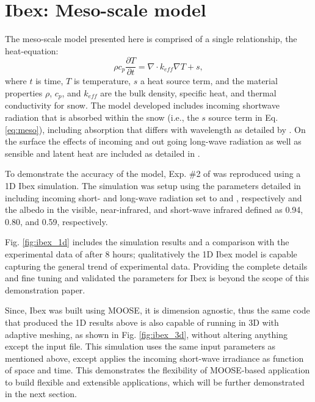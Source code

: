\section{Ibex: Meso-scale model}\label{sec:ibex}
The meso-scale model presented here is comprised of a single relationship, the heat-equation:
\begin{equation}\label{eq:meso}
\rho c_p \frac{\partial{T}}{\partial t} = \nabla \cdot k_{eff} \nabla T + s,
\end{equation}
where $t$ is time, $T$ is temperature, $s$ a heat source term, and the material properties $\rho$, $c_p$, and $k_{eff}$ are the bulk density, specific heat, and thermal conductivity for snow. The model developed includes incoming shortwave radiation that is absorbed within the snow (i.e., the $s$ source term in Eq. \eqref{eq:meso}), including absorption that differs with wavelength as detailed by \citet[][Ch.4]{slaughter2010numerical}. On the surface the effects of incoming and out going long-wave radiation as well as sensible and latent heat are included as detailed in \citet{slaughter2010numerical}.

To demonstrate the accuracy of the model, Exp. \#2 of \citet{morstad2007experimental} was reproduced using a 1D Ibex simulation. The simulation was setup using the parameters detailed in \citet[][Ch.4]{slaughter2010numerical} including incoming short- and long-wave radiation set to  and , respectively and the albedo in the visible, near-infrared, and short-wave infrared defined as 0.94, 0.80, and 0.59, respectively.

Fig. \ref{fig:ibex_1d} includes the simulation results and a comparison with the experimental data of \citet{morstad2007experimental} after 8 hours; qualitatively the 1D Ibex model is capable capturing the general trend of experimental data. Providing the complete details and fine tuning and validated the parameters for Ibex is beyond the scope of this demonstration paper.



Since, Ibex was built using MOOSE, it is dimension agnostic, thus the same code that produced the 1D results above is also capable of running in 3D with adaptive meshing, as shown in Fig. \ref{fig:ibex_3d}, without altering anything except the input file. This simulation uses the same input parameters as mentioned above, except applies the incoming short-wave irradiance as function of space and time. This demonstrates the flexibility of MOOSE-based application to build flexible and extensible applications, which will be further demonstrated in the next section.


